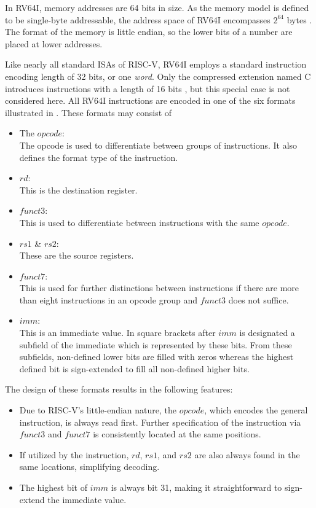 In RV64I, memory addresses are 64 bits in size. As the memory model
is defined to be single-byte addressable, the address space of RV64I
encompasses $2^{64}$ bytes \cite[Chapter 1.4]{riscv-isa}. The format
of the memory is little endian, so the lower bits of a number are
placed at lower addresses.

Like nearly all standard ISAs of RISC-V, RV64I employs a standard
instruction encoding length of 32 bits, or one \emph{word}. Only the
compressed extension named C introduces instructions with a length of
16 bits \cite[Chapter 1.5]{riscv-isa}, but this special case is not
considered here. All RV64I instructions are encoded in one of the six
formats illustrated in . These formats may
consist of
\begin{itemize}
      \item The $opcode$:\\ The opcode is used to differentiate between groups of
            instructions. It also defines the format type of the instruction.
      \item $rd$:\\ This is the destination register.
      \item $funct3$:\\ This is used to differentiate between instructions with
            the same $opcode$.
      \item $rs1$ \& $rs2$:\\ These are the source registers.
      \item $funct7$:\\ This is used for further distinctions between
            instructions if there are more than eight instructions in an opcode
            group and $funct3$ does not suffice.
      \item $imm$:\\ This is an immediate value. In square brackets after $imm$
            is designated a subfield of the immediate which is represented by
            these bits. From these subfields, non-defined lower bits are filled
            with zeros whereas the highest defined bit is sign-extended to fill
            all non-defined higher bits.
\end{itemize}



The design of these formats results in the following features:
\begin{itemize}
      \item Due to RISC-V's little-endian nature, the $opcode$, which encodes the
            general instruction, is always read first. Further specification of
            the instruction via $funct3$ and $funct7$ is consistently located at
            the same positions.
      \item If utilized by the instruction, $rd$, $rs1$, and $rs2$ are also
            always found in the same locations, simplifying decoding.
      \item The highest bit of $imm$ is always bit 31, making it straightforward
            to sign-extend the immediate value.
\end{itemize}


